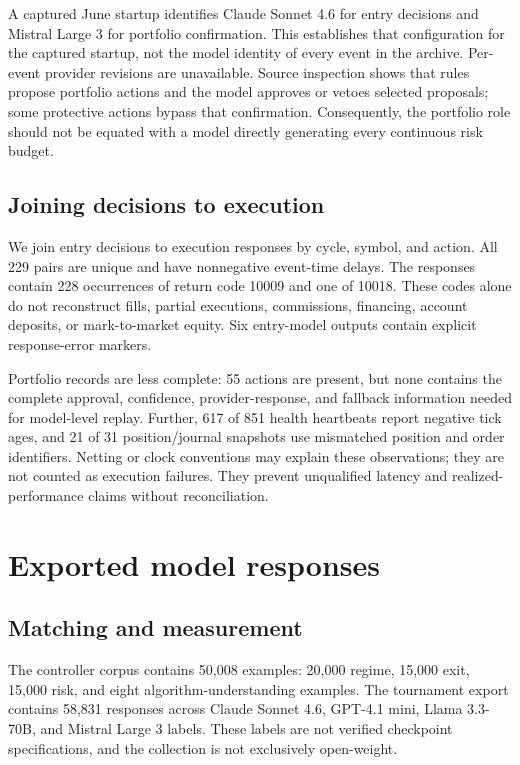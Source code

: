 A captured June startup identifies Claude Sonnet 4.6 for entry decisions and Mistral Large 3 for portfolio confirmation. This establishes that configuration for the captured startup, not the model identity of every event in the archive. Per-event provider revisions are unavailable. Source inspection shows that rules propose portfolio actions and the model approves or vetoes selected proposals; some protective actions bypass that confirmation. Consequently, the portfolio role should not be equated with a model directly generating every continuous risk budget.

\subsection{Joining decisions to execution}
We join entry decisions to execution responses by cycle, symbol, and action. All 229 pairs are unique and have nonnegative event-time delays. The responses contain 228 occurrences of return code 10009 and one of 10018. These codes alone do not reconstruct fills, partial executions, commissions, financing, account deposits, or mark-to-market equity. Six entry-model outputs contain explicit response-error markers.

Portfolio records are less complete: 55 actions are present, but none contains the complete approval, confidence, provider-response, and fallback information needed for model-level replay. Further, 617 of 851 health heartbeats report negative tick ages, and 21 of 31 position/journal snapshots use mismatched position and order identifiers. Netting or clock conventions may explain these observations; they are not counted as execution failures. They prevent unqualified latency and realized-performance claims without reconciliation.

\section{Exported model responses}
\subsection{Matching and measurement}
The controller corpus contains 50,008 examples: 20,000 regime, 15,000 exit, 15,000 risk, and eight algorithm-understanding examples. The tournament export contains 58,831 responses across Claude Sonnet 4.6, GPT-4.1 mini, Llama 3.3-70B, and Mistral Large 3 labels. These labels are not verified checkpoint specifications, and the collection is not exclusively open-weight.

